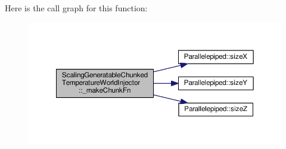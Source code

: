 Here is the call graph for this function\-:
\nopagebreak
\begin{figure}[H]
\begin{center}
\leavevmode
\includegraphics[width=350pt]{class_scaling_generatable_chunked_temperature_world_injector_ac283a716752adf93a706050bad4c4336_cgraph}
\end{center}
\end{figure}


